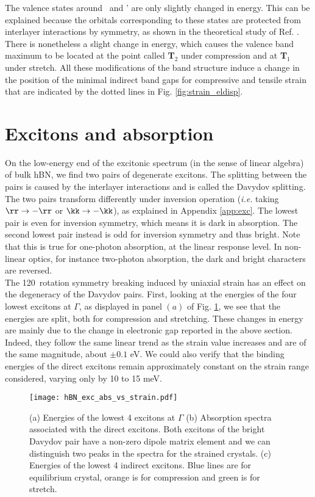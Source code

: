 The valence states around \KK~and \KK' are only slightly changed in energy. This can be explained because the orbitals corresponding to these states are protected from interlayer interactions by symmetry, as shown in the theoretical study of Ref. \cite{kang2016unified}. There is nonetheless a slight change in energy, which causes the valence band maximum to be located at the point called \textbf{T}$_2$ under compression and at \textbf{T}$_1$ under stretch. %
All these modifications of the band structure induce a change in the position of the minimal indirect band gaps for compressive and tensile strain that are indicated by the dotted lines in Fig. \ref{fig:strain_eldisp}.


%
\section{Excitons and absorption}
On the low-energy end of the excitonic spectrum (in the sense of linear algebra) of bulk \acrshort{hBN}, we find two pairs of degenerate excitons. The splitting between the pairs is caused by the interlayer interactions and is called the Davydov splitting.\cite{paleari2018excitons} The two pairs transform differently under inversion operation (\textit{i.e.} taking $\rr \to -\rr$ or $\kk \to -\kk$), as explained in Appendix \ref{app:exc}. The lowest pair is even for inversion symmetry, which means it is dark in absorption. The second lowest pair instead is odd for inversion symmetry and thus bright.
Note that this is true for one-photon absorption, at the linear response level. In non-linear optics, for instance two-photon absorption, the dark and bright characters are reversed.\cite{attaccalite2018two} \\
The 120\textdegree~rotation symmetry breaking induced by uniaxial strain has an effect on the degeneracy of the Davydov pairs. First, looking at the energies of the four lowest excitons at $\Gamma$, as displayed in panel $(a)$ of Fig. \ref{fig:exc_abs_vs_strain}, we see that the energies are split, both for compression and stretching. 
These changes in energy are mainly due to the change in electronic gap reported in the above section. Indeed, they follow the same linear trend as the strain value increases and are of the same magnitude, about $\pm 0.1$ eV. We could also verify that the binding energies of the direct excitons remain approximately constant on the strain range considered, varying only by 10 to 15 meV.
\begin{figure}[tbp]
	\vspace{0.2cm}
	\setcapindent{2em}
	\centering
	\texttt{[image: hBN\_exc\_abs\_vs\_strain.pdf]}
	\caption{(a) Energies of the lowest 4 excitons at $\Gamma$ (b) Absorption spectra associated with the direct excitons. Both excitons of the bright Davydov pair have a non-zero dipole matrix element and we can distinguish two peaks in the spectra for the strained crystals. (c) Energies of the lowest 4 indirect excitons. Blue lines are for equilibrium crystal, orange is for compression and green is for stretch. }
	\label{fig:exc_abs_vs_strain}
\end{figure}

